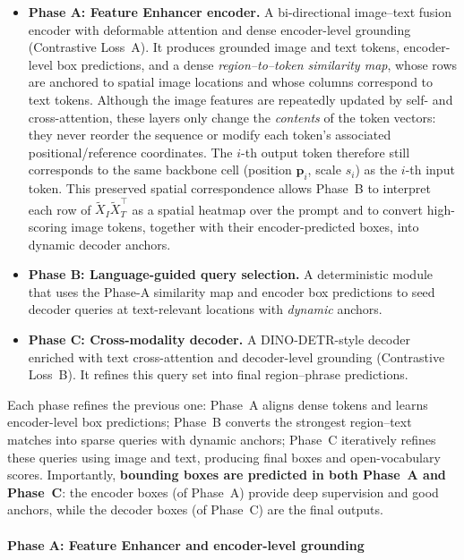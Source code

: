 \begin{enrichment}
\begin{enrichment}[Method][subsection]
		\begin{itemize}
			\item \textbf{Phase A: Feature Enhancer encoder.} A bi-directional image--text fusion encoder with deformable attention and dense encoder-level grounding (Contrastive Loss~A). It produces grounded image and text tokens, encoder-level box predictions, and a dense \emph{region--to--token similarity map}, whose rows are anchored to spatial image locations and whose columns correspond to text tokens. Although the image features are repeatedly updated by self- and cross-attention, these layers only change the \emph{contents} of the token vectors: they never reorder the sequence or modify each token’s associated positional/reference coordinates. The \(i\)-th output token therefore still corresponds to the same backbone cell (position \(\mathbf{p}_i\), scale \(s_i\)) as the \(i\)-th input token. This preserved spatial correspondence allows Phase~B to interpret each row of \(\tilde{X}_I \tilde{X}_T^\top\) as a spatial heatmap over the prompt and to convert high-scoring image tokens, together with their encoder-predicted boxes, into dynamic decoder anchors.
			\item \textbf{Phase B: Language-guided query selection.} A deterministic module that uses the Phase-A similarity map and encoder box predictions to seed decoder queries at text-relevant locations with \emph{dynamic} anchors.
			\item \textbf{Phase C: Cross-modality decoder.} A DINO-DETR-style decoder enriched with text cross-attention and decoder-level grounding (Contrastive Loss~B). It refines this query set into final region--phrase predictions.
		\end{itemize}
		Each phase refines the previous one: Phase~A aligns dense tokens and learns encoder-level box predictions; Phase~B converts the strongest region--text matches into sparse queries with dynamic anchors; Phase~C iteratively refines these queries using image and text, producing final boxes and open-vocabulary scores. Importantly, \textbf{bounding boxes are predicted in both Phase~A and Phase~C}: the encoder boxes (of Phase~A) provide deep supervision and good anchors, while the decoder boxes (of Phase~C) are the final outputs.
		
		\paragraph{Phase A: Feature Enhancer and encoder-level grounding}
		

\end{enrichment}
\end{enrichment}
